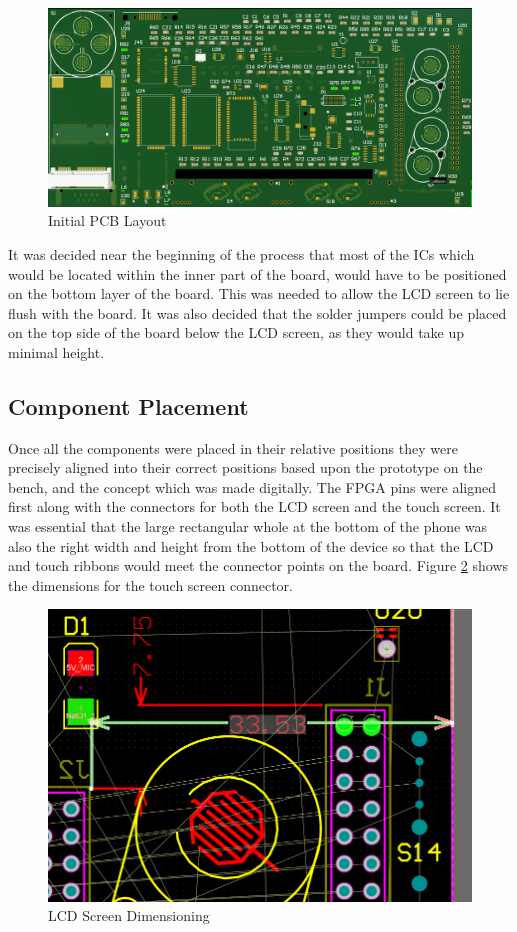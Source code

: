 \begin{figure}
	\includegraphics[width=\linewidth]{Figures/PCB.png}
	\caption{Initial PCB Layout}
	\label{fig:Initial_PCB}
\end{figure}

	It was decided near the beginning of the process that most of the ICs which would be located within the inner part of the board, would have to be positioned on the bottom layer of the board. 
This was needed to allow the LCD screen to lie flush with the board. 
It was also decided that the solder jumpers could be placed on the top side of the board below the LCD screen, as they would take up minimal height.\\

\subsection{Component Placement}
	Once all the components were placed in their relative positions they were precisely aligned into their correct positions based upon the prototype on the bench, and the concept which was made digitally. 
The FPGA pins were aligned first along with the connectors for both the LCD screen and the touch screen. 
It was essential that the large rectangular whole at the bottom of the phone was also the right width and height from the bottom of the device so that the LCD and touch ribbons would meet the connector points on the board. 
Figure \ref{fig:component_placement} shows the dimensions for the touch screen connector. 

\begin{figure}
	\includegraphics[width=\linewidth]{Figures/component_placement.png}\centering
	\caption{LCD Screen Dimensioning}
	\label{fig:component_placement}
\end{figure}


